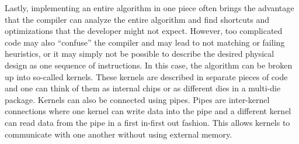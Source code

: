 Lastly, implementing an entire algorithm in one piece often brings the advantage that the compiler can analyze the entire algorithm and find shortcuts and optimizations that the developer might not expect. However, too complicated code may also ``confuse'' the compiler and may lead to not matching or failing heuristics, or it may simply not be possible to describe the desired physical design as one sequence of instructions. In this case, the algorithm can be broken up into so-called kernels. These kernels are described in separate pieces of code and one can think of them as internal chips or as different dies in a multi-die package. Kernels can also be connected using pipes. Pipes are inter-kernel connections where one kernel can write data into the pipe and a different kernel can read data from the pipe in a first in-first out fashion. This allows kernels to communicate with one another without using external memory.